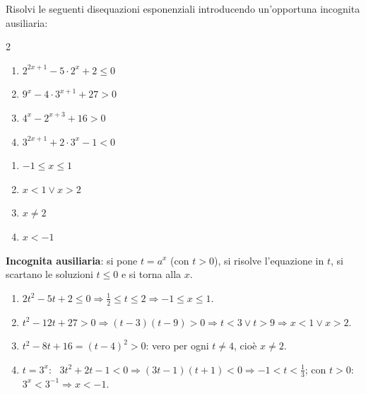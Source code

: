 
\begin{question}[ID=5.7, subtitle={Disequazioni con sostituzione: esponenti traslati}, difficulty=media, tags={disequazioni, esponenziali, sostituzione}]
Risolvi le seguenti disequazioni esponenziali introducendo un'opportuna incognita ausiliaria:
\begin{center}\begin{minipage}{0.92\linewidth}
\begin{multicols}{2}
\begin{enumerate}[leftmargin=3.2cm]
\item $2^{2x+1} - 5 \cdot 2^{x} + 2 \leq 0$
\item $9^{x} - 4 \cdot 3^{x+1} + 27 > 0$
\item $4^{x} - 2^{x+3} + 16 > 0$
\item $3^{2x+1} + 2 \cdot 3^{x} - 1 < 0$
\end{enumerate}
\end{multicols}
\end{minipage}\end{center}
\begin{solution}
\begin{enumerate}
    \item $-1\leq x\leq1$
    \item $x<1\vee x>2$
    \item $x\neq2$
    \item $x<-1$
\end{enumerate}
\end{solution}
\begin{explanation}
\textbf{Incognita ausiliaria}: si pone $t=a^x$ (con $t>0$), si risolve l'equazione in $t$, si scartano le soluzioni $t\leq0$ e si torna alla $x$.
\begin{enumerate}
    \item $2t^2-5t+2\leq0 \Rightarrow \tfrac12\leq t\leq2 \Rightarrow -1\leq x\leq1$.
    \item $t^2-12t+27>0 \Rightarrow (t-3)(t-9)>0 \Rightarrow t<3 \vee t>9 \Rightarrow x<1 \vee x>2$.
    \item $t^2-8t+16=(t-4)^2>0$: vero per ogni $t\neq4$, cioè $x\neq2$.
    \item $t=3^x$: \ $3t^2+2t-1<0 \Rightarrow (3t-1)(t+1)<0 \Rightarrow -1<t<\tfrac13$; con $t>0$: $3^x<3^{-1} \Rightarrow x<-1$.
\end{enumerate}
\end{explanation}
\end{question}

